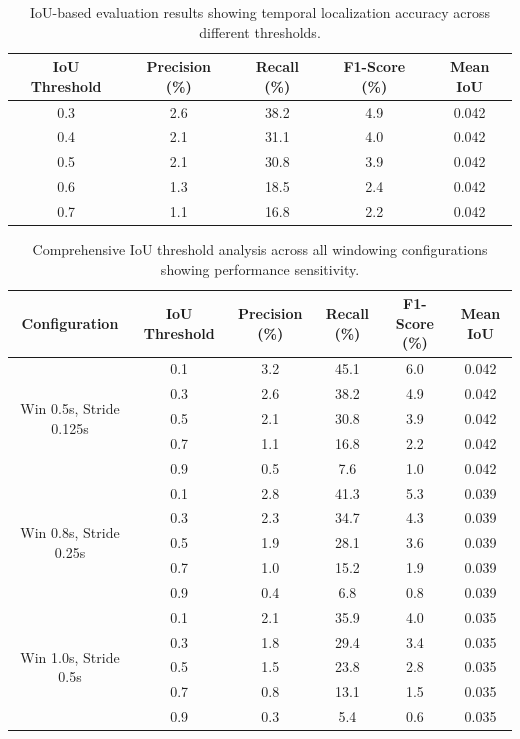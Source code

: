 \documentclass[11pt]{article}
\begin{document}
\begin{table}[H]
    \caption{IoU-based evaluation results showing temporal localization accuracy across different thresholds.}
    \centering
    \label{tab:iou-evaluation}
    \begin{tabular}{|c|c|c|c|c|}
        \hline
        \textbf{IoU Threshold} & \textbf{Precision (\%)} & \textbf{Recall (\%)} & \textbf{F1-Score (\%)} & \textbf{Mean IoU} \\
        \hline
        0.3 & 2.6 & 38.2 & 4.9 & 0.042 \\
        0.4 & 2.1 & 31.1 & 4.0 & 0.042 \\
        0.5 & 2.1 & 30.8 & 3.9 & 0.042 \\
        0.6 & 1.3 & 18.5 & 2.4 & 0.042 \\
        0.7 & 1.1 & 16.8 & 2.2 & 0.042 \\
        \hline
    \end{tabular}
\end{table}

\begin{table}[H]
    \caption{Comprehensive IoU threshold analysis across all windowing configurations showing performance sensitivity.}
    \centering
    \label{tab:comprehensive-iou-analysis}
    \begin{tabular}{|c|c|c|c|c|c|}
        \hline
        \textbf{Configuration} & \textbf{IoU Threshold} & \textbf{Precision (\%)} & \textbf{Recall (\%)} & \textbf{F1-Score (\%)} & \textbf{Mean IoU} \\
        \hline
        \multirow{5}{*}{Win 0.5s, Stride 0.125s} & 0.1 & 3.2 & 45.1 & 6.0 & 0.042 \\
        & 0.3 & 2.6 & 38.2 & 4.9 & 0.042 \\
        & 0.5 & 2.1 & 30.8 & 3.9 & 0.042 \\
        & 0.7 & 1.1 & 16.8 & 2.2 & 0.042 \\
        & 0.9 & 0.5 & 7.6 & 1.0 & 0.042 \\
        \hline
        \multirow{5}{*}{Win 0.8s, Stride 0.25s} & 0.1 & 2.8 & 41.3 & 5.3 & 0.039 \\
        & 0.3 & 2.3 & 34.7 & 4.3 & 0.039 \\
        & 0.5 & 1.9 & 28.1 & 3.6 & 0.039 \\
        & 0.7 & 1.0 & 15.2 & 1.9 & 0.039 \\
        & 0.9 & 0.4 & 6.8 & 0.8 & 0.039 \\
        \hline
        \multirow{5}{*}{Win 1.0s, Stride 0.5s} & 0.1 & 2.1 & 35.9 & 4.0 & 0.035 \\
        & 0.3 & 1.8 & 29.4 & 3.4 & 0.035 \\
        & 0.5 & 1.5 & 23.8 & 2.8 & 0.035 \\
        & 0.7 & 0.8 & 13.1 & 1.5 & 0.035 \\
        & 0.9 & 0.3 & 5.4 & 0.6 & 0.035 \\
        \hline
    \end{tabular}
\end{table}
\end{document}
